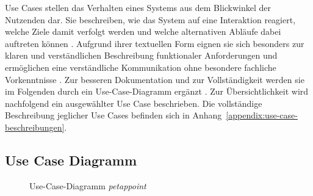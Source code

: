 Use Cases stellen das Verhalten eines Systems aus dem Blickwinkel der Nutzenden dar. Sie beschreiben, wie das System auf eine Interaktion reagiert, welche Ziele damit verfolgt werden und welche alternativen Abläufe dabei auftreten können \cite[S.~15]{cockburn2001}. Aufgrund ihrer textuellen Form eignen sie sich besonders zur klaren und verständlichen Beschreibung funktionaler Anforderungen und ermöglichen eine verständliche Kommunikation ohne besondere fachliche Vorkenntnisse \cite[S.~15]{cockburn2001}. Zur besseren Dokumentation und zur Vollständigkeit werden sie im Folgenden durch ein Use-Case-Diagramm ergänzt \cite[S.~75]{pohl2021}. Zur Übersichtlichkeit wird nachfolgend ein ausgewählter Use Case beschrieben. Die vollständige Beschreibung jeglicher Use Cases befinden sich in Anhang~\ref{appendix:use-case-beschreibungen}.

\subsection{Use Case Diagramm}
\begin{figure}[H]
    \centering
    
    \caption{Use-Case-Diagramm \textit{petappoint}}
    \label{fig:usecase-gesamt}
\end{figure}

